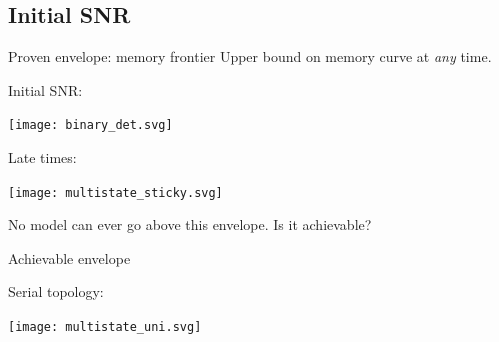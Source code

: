 \documentclass{beamer}%
\begin{document}

\subsection{Initial SNR}


\begin{frame}{Proven envelope: memory frontier}
%
 Upper bound on memory curve at \emph{any} time.

\vp
\parbox[c]{0.55\linewidth}{
 \begin{center}
 \end{center}
}
\hspace{0.02\linewidth}
\parbox[c]{0.4\linewidth}{
   Initial SNR: %
   \begin{center}
     \texttt{[image: binary\_det.svg]}
   \end{center}

   \vp Late times: %
   \begin{center}
     \texttt{[image: multistate\_sticky.svg]}
   \end{center}
}


 \vp No model can ever go above this envelope.
 Is it achievable?
%
\end{frame}


\begin{frame}{Achievable envelope}
%
 \parbox[c]{0.67\linewidth}{
 }
 \parbox[c]{0.3\linewidth}{
   Serial topology:
   \begin{center}
     \texttt{[image: multistate\_uni.svg]}
   \end{center}
 }
%
\end{frame}
\end{document}
